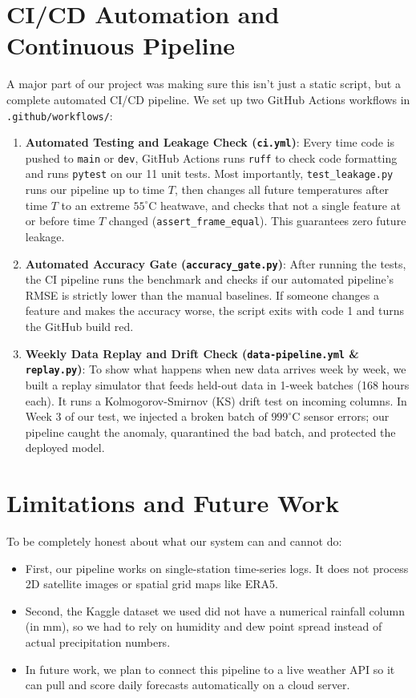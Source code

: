 \documentclass[conference]{IEEEtran}
\begin{document}
\section{CI/CD Automation and Continuous Pipeline}
A major part of our project was making sure this isn't just a static script, but a complete automated CI/CD pipeline. We set up two GitHub Actions workflows in \texttt{.github/workflows/}:
\begin{enumerate}
    \item \textbf{Automated Testing and Leakage Check (\texttt{ci.yml})}: Every time code is pushed to \texttt{main} or \texttt{dev}, GitHub Actions runs \texttt{ruff} to check code formatting and runs \texttt{pytest} on our 11 unit tests. Most importantly, \texttt{test\_leakage.py} runs our pipeline up to time $T$, then changes all future temperatures after time $T$ to an extreme $55^\circ\text{C}$ heatwave, and checks that not a single feature at or before time $T$ changed (\texttt{assert\_frame\_equal}). This guarantees zero future leakage.
    \item \textbf{Automated Accuracy Gate (\texttt{accuracy\_gate.py})}: After running the tests, the CI pipeline runs the benchmark and checks if our automated pipeline's RMSE is strictly lower than the manual baselines. If someone changes a feature and makes the accuracy worse, the script exits with code 1 and turns the GitHub build red.
    \item \textbf{Weekly Data Replay and Drift Check (\texttt{data-pipeline.yml} \& \texttt{replay.py})}: To show what happens when new data arrives week by week, we built a replay simulator that feeds held-out data in 1-week batches (168 hours each). It runs a Kolmogorov-Smirnov (KS) drift test on incoming columns. In Week 3 of our test, we injected a broken batch of $999^\circ\text{C}$ sensor errors; our pipeline caught the anomaly, quarantined the bad batch, and protected the deployed model.
\end{enumerate}

\section{Limitations and Future Work}
To be completely honest about what our system can and cannot do:
\begin{itemize}
    \item First, our pipeline works on single-station time-series logs. It does not process 2D satellite images or spatial grid maps like ERA5.
    \item Second, the Kaggle dataset we used did not have a numerical rainfall column (in mm), so we had to rely on humidity and dew point spread instead of actual precipitation numbers.
    \item In future work, we plan to connect this pipeline to a live weather API so it can pull and score daily forecasts automatically on a cloud server.
\end{itemize}
\end{document}
